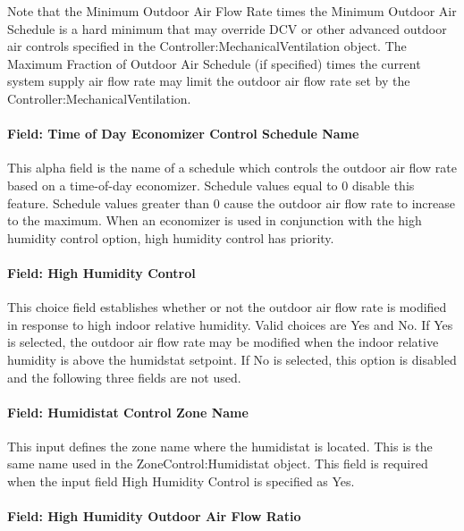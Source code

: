 Note that the Minimum Outdoor Air Flow Rate times the Minimum Outdoor Air Schedule is a hard minimum that may override DCV or other advanced outdoor air controls specified in the Controller:MechanicalVentilation object.  The Maximum Fraction of Outdoor Air Schedule (if specified) times the current system supply air flow rate may limit the outdoor air flow rate set by the Controller:MechanicalVentilation.

\paragraph{Field: Time of Day Economizer Control Schedule Name}\label{field-time-of-day-economizer-control-schedule-name}

This alpha field is the name of a schedule which controls the outdoor air flow rate based on a time-of-day economizer. Schedule values equal to 0 disable this feature. Schedule values greater than 0 cause the outdoor air flow rate to increase to the maximum. When an economizer is used in conjunction with the high humidity control option, high humidity control has priority.

\paragraph{Field: High Humidity Control}\label{field-high-humidity-control}

This choice field establishes whether or not the outdoor air flow rate is modified in response to high indoor relative humidity. Valid choices are Yes and No. If Yes is selected, the outdoor air flow rate may be modified when the indoor relative humidity is above the humidstat setpoint. If No is selected, this option is disabled and the following three fields are not used.

\paragraph{Field: Humidistat Control Zone Name}\label{field-humidistat-control-zone-name}

This input defines the zone name where the humidistat is located. This is the same name used in the ZoneControl:Humidistat object. This field is required when the input field High Humidity Control is specified as Yes.

\paragraph{Field: High Humidity Outdoor Air Flow Ratio}\label{field-high-humidity-outdoor-air-flow-ratio}

